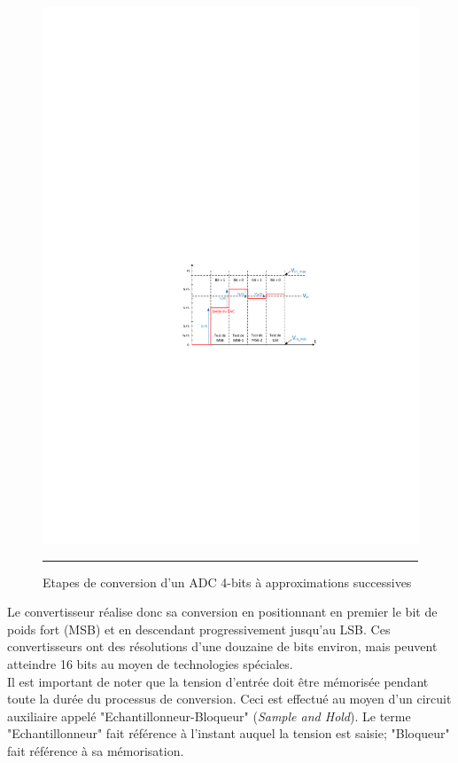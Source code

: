 \begin{figure}[htb]
  \centering
  \includegraphics [angle=0, width=13cm]{./Figures/Chap11_ADC/ADC_SAR.pdf}
  \rule{35em}{0.5pt}
  \caption{Etapes de conversion d'un ADC 4-bits à approximations successives}
  \label{fig:ADC_SAR}
\end{figure}

Le convertisseur réalise donc sa conversion en positionnant en premier le bit de poids fort (MSB) et en descendant progressivement jusqu'au LSB.
Ces convertisseurs ont des résolutions d'une douzaine de bits environ, mais peuvent atteindre 16 bits au moyen de technologies spéciales.\\

Il est important de noter que la tension d'entrée doit être mémorisée pendant toute la durée du processus de conversion. Ceci est effectué au moyen d'un circuit auxiliaire appelé "Echantillonneur-Bloqueur" (\textit{Sample and Hold}). Le terme "Echantillonneur" fait référence à l'instant auquel la tension est saisie; "Bloqueur" fait référence à sa mémorisation. 

